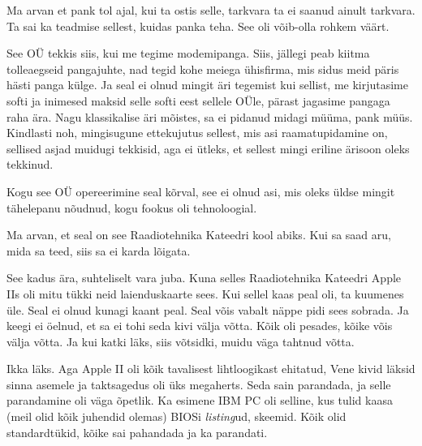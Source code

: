 Ma arvan et pank  tol ajal, kui ta ostis selle, tarkvara ta ei saanud ainult tarkvara. Ta sai ka teadmise sellest, kuidas panka teha. See oli võib-olla rohkem väärt.


See OÜ tekkis siis, kui me tegime modemipanga. Siis, jällegi peab kiitma tolleaegseid pangajuhte, nad tegid kohe meiega ühisfirma,  mis sidus meid päris hästi panga külge. Ja seal ei olnud mingit äri tegemist kui sellist, me kirjutasime softi ja inimesed maksid selle softi eest sellele OÜle, pärast jagasime pangaga raha ära. Nagu klassikalise äri mõistes, sa ei pidanud midagi müüma, pank müüs. Kindlasti noh, mingisugune ettekujutus sellest, mis asi raamatupidamine on,  sellised asjad muidugi tekkisid, aga  ei ütleks, et sellest mingi eriline ärisoon oleks tekkinud.

Kogu see OÜ  opereerimine seal kõrval,  see  ei olnud asi, mis oleks üldse mingit tähelepanu nõudnud, kogu fookus oli tehnoloogial.


Ma arvan, et seal on see Raadiotehnika Kateedri kool abiks. Kui sa saad aru, mida sa teed, siis sa ei karda lõigata.


See kadus ära, suhteliselt vara juba. Kuna selles Raadiotehnika Kateedri Apple IIs oli mitu tükki neid laienduskaarte sees. Kui sellel kaas peal oli, ta  kuumenes üle. Seal ei olnud kunagi kaant peal. Seal võis vabalt näppe pidi sees sobrada. Ja keegi  ei öelnud, et sa ei tohi seda kivi välja võtta. Kõik oli pesades, kõike võis välja võtta.  Ja kui katki läks, siis võtsidki, muidu väga tahtnud võtta. 


Ikka läks. Aga Apple II oli kõik tavalisest lihtloogikast ehitatud, Vene kivid läksid sinna asemele ja taktsagedus oli üks megaherts. Seda sain parandada, ja selle parandamine oli väga õpetlik. Ka esimene IBM PC oli selline, kus tulid kaasa (meil olid kõik juhendid olemas)  BIOSi \emph{listing}ud, skeemid. Kõik olid standardtükid, kõike sai pahandada ja ka parandati. 

